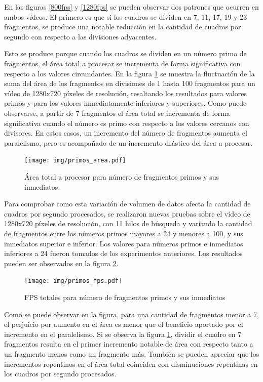 En las figuras \ref{800fps} y \ref{1280fps} se pueden observar dos patrones que
ocurren en ambos vídeos. El primero es que si los cuadros se dividen en 7, 11,
17, 19 y 23 fragmentos, se produce una notable reducción en la cantidad de
cuadros por segundo con respecto a las divisiones adyacentes.

Esto se produce porque cuando los cuadros se dividen en un número primo de
fragmentos, el área total a procesar se incrementa de forma significativa con
respecto a los valores circundantes. En la figura \ref{primosArea} se muestra la
fluctuación de la suma del área de los fragmentos en divisiones de 1 hasta 100
fragmentos para un vídeo de 1280x720 píxeles de resolución, resaltando los
resultados para valores primos y para los valores inmediatamente inferiores y
superiores. Como puede observarse, a partir de 7 fragmentos el área total se
incrementa de forma significativa cuando el número es primo con respecto a los
valores cercanos con divisores. En estos casos, un incremento del número
de fragmentos aumenta el paralelismo, pero es acompañado de un incremento
drástico del área a procesar.

\begin{figure}[!h]

	\texttt{[image: img/primos\_area.pdf]}
	\caption{Área total a procesar para número de fragmentos primos y sus inmediatos}
	\label{primosArea}

\end{figure}

Para comprobar como esta variación de volumen de datos afecta la cantidad de
cuadros por segundo procesados, se realizaron nuevas pruebas sobre el vídeo de
1280x720 píxeles de resolución, con 11 hilos de búsqueda y variando la cantidad
de fragmentos entre los números primos mayores a 24 y menores a 100, y sus
inmediatos superior e inferior. Los valores para números primos e inmediatos
inferiores a 24 fueron tomados de los experimentos anteriores. Los resultados
pueden ser observados en la figura \ref{primosFPS}.

\begin{figure}[!h]

	\texttt{[image: img/primos\_fps.pdf]}
	\caption{FPS totales para número de fragmentos primos y sus inmediatos}
	\label{primosFPS}

\end{figure}

Como se puede observar en la figura, para una cantidad de fragmentos menor a 7,
el perjuicio por aumento en el área es menor que el beneficio aportado por el
incremento en el paralelismo. Si se observa la figura \ref{primosArea}, dividir
el cuadro en 7 fragmentos resulta en el primer incremento notable de área con
respecto tanto a un fragmento menos como un fragmento más. También se pueden
apreciar que los incrementos repentinos en el área total coinciden con
disminuciones repentinas en los cuadros por segundo procesados.


